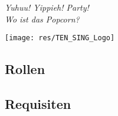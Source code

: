 \vspace*{\fill}
\begin{flushright}
\textit{Yuhuu! Yippieh! Party!}\\
\textit{Wo ist das Popcorn?}
\end{flushright}

\tableofcontents

\vspace{3mm}

\begin{minipage}{\textwidth}
\begin{center}
\texttt{[image: res/TEN\_SING\_Logo]}
\end{center}
\end{minipage}

\pagebreak

\subsection{Rollen}
\usehyperlinkstrue
\ListOfPersons
\subsection{Requisiten}
\ListOfRequisites




















